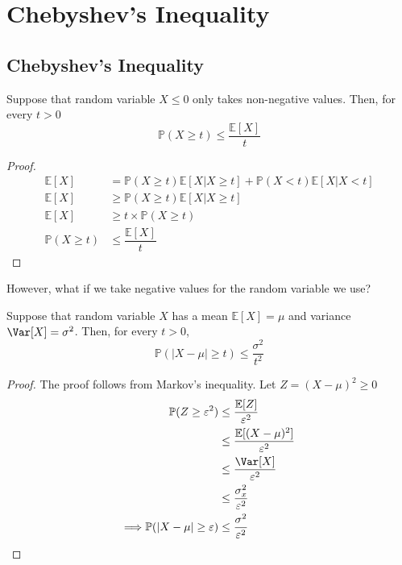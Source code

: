 \chapter{Chebyshev's Inequality}

\section{Chebyshev's Inequality}
\begin{theorem}
    Suppose that random variable \(X \leq 0\) only takes non-negative values. Then, for every \(t > 0\) 
    \[
        \mathbb{P}(X \geq t) \leq \dfrac{\mathbb{E}[X]}{t}
    \]
    \begin{proof}
        \[
            \begin{aligned}
                \mathbb{E}[X] &= \mathbb{P}(X \geq t)\mathbb{E}[X \vert X \geq t] + \mathbb{P}(X < t)\mathbb{E}[X \vert X < t] \\
                \mathbb{E}[X] &\geq \mathbb{P}(X \geq t)\mathbb{E}[X \vert X \geq t] \\
                \mathbb{E}[X] &\geq t \times \mathbb{P}(X \geq t) \\
                \mathbb{P}(X \geq t) &\leq \dfrac{\mathbb{E}[X]}{t}
            \end{aligned}
        \]
    \end{proof}
\end{theorem}

However, what if we take negative values for the random variable we use? 
\begin{theorem}
    Suppose that random variable \(X\) has a mean \(\mathbb{E}[X] = \mu\) and variance \(\Var[X] = \sigma^2\). Then, for every \(t > 0\), 
    \[
        \mathbb{P}(\vert X - \mu \vert \geq t) \leq \dfrac{\sigma^2}{t^2}
    \]
    \begin{proof}
        The proof follows from Markov's inequality. Let \(Z = (X - \mu)^2 \geq 0\) 
        \[
            \begin{aligned}
                \mathbb{P}(Z \geq \varepsilon^2) &\leq \dfrac{\mathbb{E}[Z]}{\varepsilon^2} \\
                &\leq \dfrac{\mathbb{E}[(X - \mu)^2]}{\varepsilon^2} \\
                &\leq \dfrac{\Var[X]}{\varepsilon^2} \\
                &\leq \dfrac{\sigma_x^2}{\varepsilon^2} \\
                \Longrightarrow \mathbb{P}(\vert X - \mu \vert \geq \varepsilon) &\leq \dfrac{\sigma^2}{\varepsilon^2}
            \end{aligned}
        \]
    \end{proof}
\end{theorem}

